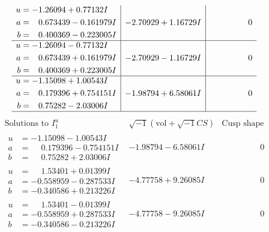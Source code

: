 \documentclass[1p]{elsarticle_modified}
\theoremstyle{definition}
\newcommand{\I}{\sqrt{-1}}
\begin{document}
$$\begin{array}{c|c|c}
\begin{aligned}
u &= -1.26094 + 0.77132 I \\
a &= \phantom{-}0.673439 - 0.161979 I \\
b &= \phantom{-}0.400369 - 0.223005 I\end{aligned}
 & -2.70929 + 1.16729 I & \phantom{-0.000000 } 0 \\ \hline\begin{aligned}
u &= -1.26094 - 0.77132 I \\
a &= \phantom{-}0.673439 + 0.161979 I \\
b &= \phantom{-}0.400369 + 0.223005 I\end{aligned}
 & -2.70929 - 1.16729 I & \phantom{-0.000000 } 0 \\ \hline\begin{aligned}
u &= -1.15098 + 1.00543 I \\
a &= \phantom{-}0.179396 + 0.754151 I \\
b &= \phantom{-}0.75282 - 2.03006 I\end{aligned}
 & -1.98794 + 6.58061 I & \phantom{-0.000000 } 0\\
 \hline 
 \end{array}$$\newpage$$\begin{array}{c|c|c}  
\text{Solutions to }I^u_{1}& \I (\text{vol} + \sqrt{-1}CS) & \text{Cusp shape}\\
 \hline 
\begin{aligned}
u &= -1.15098 - 1.00543 I \\
a &= \phantom{-}0.179396 - 0.754151 I \\
b &= \phantom{-}0.75282 + 2.03006 I\end{aligned}
 & -1.98794 - 6.58061 I & \phantom{-0.000000 } 0 \\ \hline\begin{aligned}
u &= \phantom{-}1.53401 + 0.01399 I \\
a &= -0.558959 - 0.287533 I \\
b &= -0.340586 + 0.213226 I\end{aligned}
 & -4.77758 + 9.26085 I & \phantom{-0.000000 } 0 \\ \hline\begin{aligned}
u &= \phantom{-}1.53401 - 0.01399 I \\
a &= -0.558959 + 0.287533 I \\
b &= -0.340586 - 0.213226 I\end{aligned}
 & -4.77758 - 9.26085 I & \phantom{-0.000000 } 0 \\ \hline\begin{aligned}

\end{aligned}
\end{array}$$
\end{document}
